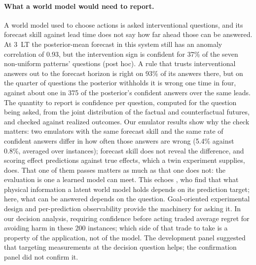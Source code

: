 \documentclass[11pt]{article}
\begin{document}
\paragraph{What a world model would need to report.} A world model used to choose actions is asked interventional questions, and its forecast skill against lead time does not say how far ahead those can be answered. At 3~LT the posterior-mean forecast in this system still has an anomaly correlation of 0.93, but the intervention sign is confident for 37\% of the seven non-uniform patterns' questions (post hoc). A rule that trusts interventional answers out to the forecast horizon is right on 93\% of its answers there, but on the quarter of questions the posterior withholds it is wrong one time in four, against about one in 375 of the posterior's confident answers over the same leads. The quantity to report is confidence per question, computed for the question being asked, from the joint distribution of the factual and counterfactual futures, and checked against realized outcomes. Our emulator results show why the check matters: two emulators with the same forecast skill and the same rate of confident answers differ in how often those answers are wrong (5.4\% against 0.8\%, averaged over instances); forecast skill does not reveal the difference, and scoring effect predictions against true effects, which a twin experiment supplies, does. That one of them passes matters as much as that one does not: the evaluation is one a learned model can meet. This echoes \citet{tan2026latent}, who find that what physical information a latent world model holds depends on its prediction target; here, what can be answered depends on the question. Goal-oriented experimental design \citep{zhong2026goaloriented,go2026goaldriven} and per-prediction observability \citep{kreutz2012likelihood} provide the machinery for asking it. In our decision analysis, requiring confidence before acting traded average regret for avoiding harm in these 200 instances; which side of that trade to take is a property of the application, not of the model. The development panel suggested that targeting measurements at the decision question helps; the confirmation panel did not confirm it.
\end{document}

